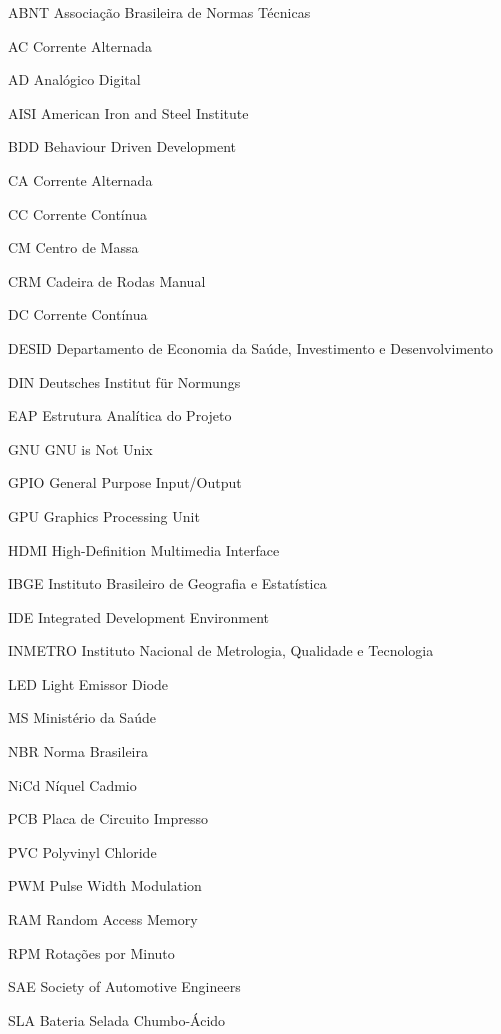 \begin{siglas}
	\item [ABNT]    Associação Brasileira de Normas Técnicas
	\item [AC]      Corrente Alternada
	\item [AD]      Analógico Digital
	\item [AISI]    American Iron and Steel Institute
	\item [BDD]     Behaviour Driven Development
	\item [CA]      Corrente Alternada
	\item [CC]      Corrente Contínua
	\item [CM]      Centro de Massa
	\item [CRM]     Cadeira de Rodas Manual
	\item [DC]      Corrente Contínua
	\item [DESID]   Departamento de Economia da Saúde, Investimento e Desenvolvimento
	\item [DIN]     Deutsches Institut für Normungs
	\item [EAP]     Estrutura Analítica do Projeto
	\item [GNU]     GNU is Not Unix
	\item [GPIO]    General Purpose Input/Output
	\item [GPU]     Graphics Processing Unit
	\item [HDMI]    High-Definition Multimedia Interface
	\item [IBGE]    Instituto Brasileiro de Geografia e Estatística
	\item [IDE]     Integrated Development Environment
	\item [INMETRO] Instituto Nacional de Metrologia, Qualidade e Tecnologia
	\item [LED]     Light Emissor Diode
	\item [MS]      Ministério da Saúde
	\item [NBR]     Norma Brasileira
	\item [NiCd]    Níquel Cadmio
	\item [PCB]     Placa de Circuito Impresso
	\item [PVC]     Polyvinyl Chloride
	\item [PWM]     Pulse Width Modulation
	\item [RAM]     Random Access Memory
	\item [RPM]     Rotações por Minuto
	\item [SAE]     Society of Automotive Engineers
	\item [SLA]     Bateria Selada Chumbo-Ácido

\end{siglas}
